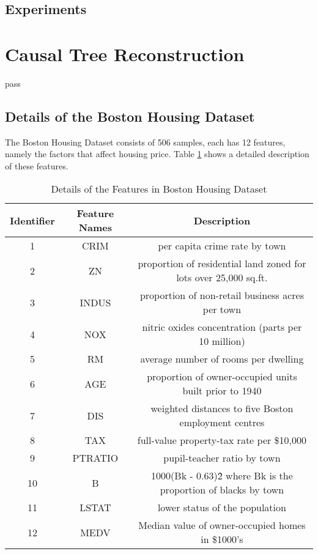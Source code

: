 \documentclass[12pt,a4paper]{article}
\theoremstyle{definition}
\begin{document}
\subsection{Experiments}

\section{Causal Tree Reconstruction}

pass

\newpage
\begin{appendix}
\section{Details of the Boston Housing Dataset}
\label{apd:boston}

The Boston Housing Dataset consists of 506 samples, each has 12 features, namely the factors that affect housing price. Table \ref{tab:boston} shows a detailed description of these features.

\begin{table}[H]
	\renewcommand\arraystretch{1.35}
	\caption{Details of the Features in Boston Housing Dataset}
	\label{tab:boston}
	\centering
	
	\begin{tabular}{c|c|c}
		\centering
		Identifier & Feature Names & Description \\
		\hline
		1 & CRIM & per capita crime rate by town \\
		2 & ZN & proportion of residential land zoned for lots over 25,000 sq.ft. \\
		3 & INDUS & proportion of non-retail business acres per town \\
		4 & NOX & nitric oxides concentration (parts per 10 million) \\
		5 & RM & average number of rooms per dwelling \\
		6 & AGE & proportion of owner-occupied units built prior to 1940 \\
		7 & DIS & weighted distances to five Boston employment centres \\
		8 & TAX & full-value property-tax rate per \$10,000 \\
		9 & PTRATIO & pupil-teacher ratio by town \\
		10 & B & 1000(Bk - 0.63)\^2 where Bk is the proportion of blacks by town \\
		11 & LSTAT & lower status of the population \\			
		12 & MEDV & Median value of owner-occupied homes in \$1000's \\
	\end{tabular}
\end{table}

\end{appendix}



\end{document}
